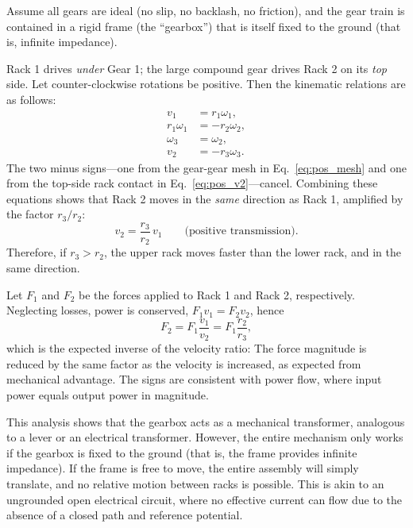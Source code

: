 \documentclass[reprint,aps,pra,superscriptaddress,longbibliography]{revtex4-2}
\begin{document}
Assume all gears are ideal (no slip, no backlash, no friction), and the gear train is contained in a rigid frame (the ``gearbox'') that is itself fixed to the ground (that is, infinite impedance).

Rack 1 drives \emph{under} Gear 1; the large compound gear drives
Rack 2 on its \emph{top} side. Let counter-clockwise rotations be
positive. Then the kinematic relations are as follows:
\begin{align}
    v_1 &= r_1 \omega_1 ,
           \label{eq:pos_v1}\\
    r_1 \omega_1 &= -r_2 \omega_2 ,
           \label{eq:pos_mesh}\\
    \omega_3 &= \omega_2 ,
           \label{eq:pos_rigid}\\
    v_2 &= -r_3 \omega_3 .
           \label{eq:pos_v2}
\end{align}
The two minus signs---one from the gear-gear mesh in Eq.~\eqref{eq:pos_mesh} and one from the top-side rack contact in Eq.~\eqref{eq:pos_v2}---cancel. Combining these equations shows that Rack 2 moves in the \emph{same} direction as Rack 1, amplified by the factor $r_3/r_2$:
\begin{equation}
   v_2 = \frac{r_3}{r_2}\,v_1 \qquad \text{(positive transmission)}.
\end{equation}
Therefore, if $r_3 > r_2$, the upper rack moves faster than the lower rack, and in the same direction.

Let $F_1$ and $F_2$ be the forces applied to Rack 1 and Rack 2, respectively. Neglecting losses, power is conserved, $F_1 v_1 = F_2 v_2$, hence
\begin{equation}
   F_2 = F_1 \frac{v_1}{v_2} = F_1 \frac{r_2}{r_3},
\end{equation}
which is the expected inverse of the velocity ratio: The force magnitude is reduced by the same factor as the velocity is increased, as expected from mechanical advantage. The signs are consistent with power flow, where input power equals output power in magnitude.

This analysis shows that the gearbox acts as a mechanical transformer, analogous to a lever or an electrical transformer. However, the entire mechanism only works if the gearbox is fixed to the ground (that is, the frame provides infinite impedance). If the frame is free to move, the entire assembly will simply translate, and no relative motion between racks is possible. This is akin to an ungrounded open electrical circuit, where no effective current can flow due to the absence of a closed path and reference potential.
\end{document}
